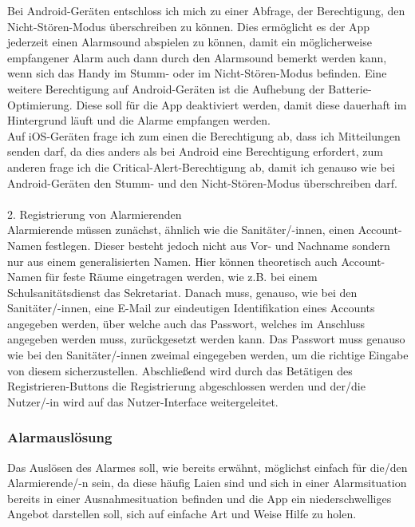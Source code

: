         \noindent Bei Android-Geräten entschloss ich mich zu einer Abfrage, der Berechtigung, den 
        Nicht-Stören-Modus überschreiben zu können. Dies ermöglicht es der App jederzeit einen Alarmsound abspielen
        zu können, damit ein möglicherweise empfangener Alarm auch dann durch den Alarmsound bemerkt werden kann, wenn
        sich das Handy im \glqq Stumm\grqq{}- oder im \glqq Nicht-Stören\grqq{}-Modus befinden.
        Eine weitere Berechtigung auf Android-Geräten ist die Aufhebung der
        Batterie-Optimierung. Diese soll für die App deaktiviert werden, damit diese
        dauerhaft im Hintergrund läuft und die Alarme empfangen werden.\\ Auf 
        iOS-Geräten frage ich zum einen die Berechtigung ab, dass ich Mitteilungen senden darf, da 
        dies anders als bei Android eine Berechtigung erfordert, zum anderen frage 
        ich die Critical-Alert-Berechtigung ab, damit ich genauso wie bei 
        Android-Geräten den \glqq Stumm-\grqq{} und den \glqq Nicht-Stören-\grqq{}Modus überschreiben darf.
        \\\\ 2. Registrierung von Alarmierenden
        \\ Alarmierende müssen zunächst, ähnlich wie die Sanitäter/-innen, einen 
        Account-Namen festlegen. Dieser besteht jedoch nicht aus Vor- und Nachname 
        sondern nur aus einem generalisierten Namen. Hier können theoretisch auch 
        Account-Namen für feste Räume eingetragen werden, wie z.B. bei einem 
        Schulsanitätsdienst das Sekretariat. Danach muss, genauso, wie bei den 
        Sanitäter/-innen, eine E-Mail zur eindeutigen Identifikation eines Accounts
        angegeben werden, über welche auch das Passwort, welches im Anschluss 
        angegeben werden muss, zurückgesetzt werden kann. Das Passwort muss genauso
        wie bei den Sanitäter/-innen zweimal eingegeben werden, um die richtige 
        Eingabe von diesem sicherzustellen. Abschließend wird durch
        das Betätigen des \glqq Registrieren\grqq{}-Buttons die Registrierung abgeschlossen 
        werden und der/die Nutzer/-in wird auf das Nutzer-Interface weitergeleitet.


\subsubsection{Alarmauslösung}
    Das Auslösen des Alarmes soll, wie bereits erwähnt, möglichst einfach für die/den 
    Alarmierende/-n sein, da diese häufig Laien sind und sich in einer
    Alarmsituation bereits in einer Ausnahmesituation befinden und die App ein niederschwelliges 
    Angebot darstellen soll, sich auf einfache Art und Weise Hilfe zu holen.

